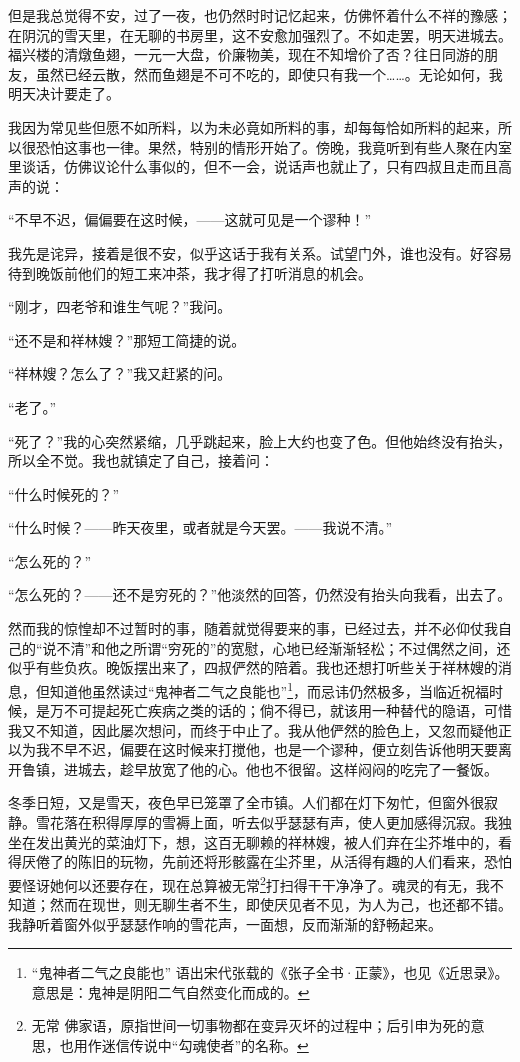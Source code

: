 \par 但是我总觉得不安，过了一夜，也仍然时时记忆起来，仿佛怀着什么不祥的豫感；在阴沉的雪天里，在无聊的书房里，这不安愈加强烈了。不如走罢，明天进城去。福兴楼的清燉鱼翅，一元一大盘，价廉物美，现在不知增价了否？往日同游的朋友，虽然已经云散，然而鱼翅是不可不吃的，即使只有我一个……。无论如何，我明天决计要走了。
\par 我因为常见些但愿不如所料，以为未必竟如所料的事，却每每恰如所料的起来，所以很恐怕这事也一律。果然，特别的情形开始了。傍晚，我竟听到有些人聚在内室里谈话，仿佛议论什么事似的，但不一会，说话声也就止了，只有四叔且走而且高声的说：
\par “不早不迟，偏偏要在这时候，——这就可见是一个谬种！”
\par 我先是诧异，接着是很不安，似乎这话于我有关系。试望门外，谁也没有。好容易待到晚饭前他们的短工来冲茶，我才得了打听消息的机会。
\par “刚才，四老爷和谁生气呢？”我问。
\par “还不是和祥林嫂？”那短工简捷的说。
\par “祥林嫂？怎么了？”我又赶紧的问。
\par “老了。”
\par “死了？”我的心突然紧缩，几乎跳起来，脸上大约也变了色。但他始终没有抬头，所以全不觉。我也就镇定了自己，接着问：
\par “什么时候死的？”
\par “什么时候？——昨天夜里，或者就是今天罢。——我说不清。”
\par “怎么死的？”
\par “怎么死的？——还不是穷死的？”他淡然的回答，仍然没有抬头向我看，出去了。
\par 然而我的惊惶却不过暂时的事，随着就觉得要来的事，已经过去，并不必仰仗我自己的“说不清”和他之所谓“穷死的”的宽慰，心地已经渐渐轻松；不过偶然之间，还似乎有些负疚。晚饭摆出来了，四叔俨然的陪着。我也还想打听些关于祥林嫂的消息，但知道他虽然读过“鬼神者二气之良能也”\footnote{“鬼神者二气之良能也” 语出宋代张载的《张子全书·正蒙》，也见《近思录》。意思是：鬼神是阴阳二气自然变化而成的。}，而忌讳仍然极多，当临近祝福时候，是万不可提起死亡疾病之类的话的；倘不得已，就该用一种替代的隐语，可惜我又不知道，因此屡次想问，而终于中止了。我从他俨然的脸色上，又忽而疑他正以为我不早不迟，偏要在这时候来打搅他，也是一个谬种，便立刻告诉他明天要离开鲁镇，进城去，趁早放宽了他的心。他也不很留。这样闷闷的吃完了一餐饭。
\par 冬季日短，又是雪天，夜色早已笼罩了全市镇。人们都在灯下匆忙，但窗外很寂静。雪花落在积得厚厚的雪褥上面，听去似乎瑟瑟有声，使人更加感得沉寂。我独坐在发出黄光的菜油灯下，想，这百无聊赖的祥林嫂，被人们弃在尘芥堆中的，看得厌倦了的陈旧的玩物，先前还将形骸露在尘芥里，从活得有趣的人们看来，恐怕要怪讶她何以还要存在，现在总算被无常\footnote{无常 佛家语，原指世间一切事物都在变异灭坏的过程中；后引申为死的意思，也用作迷信传说中“勾魂使者”的名称。}打扫得干干净净了。魂灵的有无，我不知道；然而在现世，则无聊生者不生，即使厌见者不见，为人为己，也还都不错。我静听着窗外似乎瑟瑟作响的雪花声，一面想，反而渐渐的舒畅起来。
